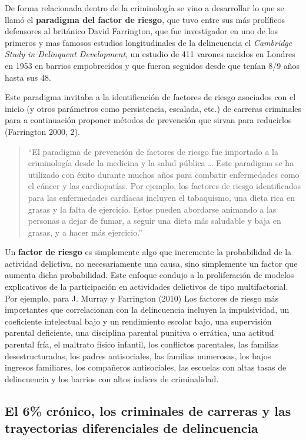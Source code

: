 \documentclass[
  spanish,
  letterpaper,
  DIV=11,
  numbers=noendperiod]{scrreprt}
\begin{document}
De forma relacionada dentro de la criminología se vino a desarrollar lo
que se llamó el \textbf{paradigma del factor de riesgo}, que tuvo entre
sus más prolíficos defensores al británico David Farrington, que fue
investigador en uno de los primeros y mas famosos estudios
longitudinales de la delincuencia el \emph{Cambridge Study in Delinquent
Development}, un estudio de 411 varones nacidos en Londres en 1953 en
barrios empobrecidos y que fueron seguidos desde que tenían 8/9 años
hasta sus 48.

Este paradigma invitaba a la identificación de factores de riesgo
asociados con el inicio (y otros parámetros como persistencia, escalada,
etc.) de carreras criminales para a continuación proponer métodos de
prevención que sirvan para reducirlos (Farrington 2000, 2).

\begin{quote}
``El paradigma de prevención de factores de riesgo fue importado a la
criminología desde la medicina y la salud pública \ldots{} Este
paradigma se ha utilizado con éxito durante muchos años para combatir
enfermedades como el cáncer y las cardiopatías. Por ejemplo, los
factores de riesgo identificados para las enfermedades cardíacas
incluyen el tabaquismo, una dieta rica en grasas y la falta de
ejercicio. Estos pueden abordarse animando a las personas a dejar de
fumar, a seguir una dieta más saludable y baja en grasas, y a hacer más
ejercicio.''
\end{quote}

Un \textbf{factor de riesgo} es simplemente algo que incremente la
probabilidad de la actividad delictiva, no necesariamente una causa,
sino simplemente un factor que aumenta dicha probabilidad. Este enfoque
condujo a la proliferación de modelos explicativos de la participación
en actividades delictivos de tipo multifactorial. Por ejemplo, para J.
Murray y Farrington (2010) Los factores de riesgo más importantes que
correlacionan con la delincuencia incluyen la impulsividad, un
coeficiente intelectual bajo y un rendimiento escolar bajo, una
supervisión parental deficiente, una disciplina parental punitiva o
errática, una actitud parental fría, el maltrato físico infantil, los
conflictos parentales, las familias desestructuradas, los padres
antisociales, las familias numerosas, los bajos ingresos familiares, los
compañeros antisociales, las escuelas con altas tasas de delincuencia y
los barrios con altos índices de criminalidad.

\subsection{El 6\% crónico, los criminales de carreras y las
trayectorias diferenciales de
delincuencia}\label{el-6-cruxf3nico-los-criminales-de-carreras-y-las-trayectorias-diferenciales-de-delincuencia}
\end{document}
